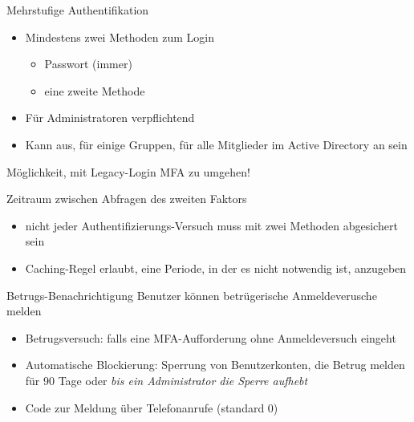 
\begin{flashcard}[Definition]{Mehrstufige Authentifikation}
    \begin{itemize}
        \item Mindestens zwei Methoden zum Login
            \begin{itemize}
                \item Passwort (immer)
                \item eine zweite Methode
            \end{itemize}
        \item Für Administratoren verpflichtend
        \item Kann aus, für einige Gruppen, für alle Mitglieder im Active Directory an sein
    \end{itemize}
    \vspace{1cm}
    Möglichkeit, mit Legacy-Login MFA zu umgehen!
\end{flashcard}


\begin{flashcard}[Definition]{Zeitraum zwischen Abfragen des zweiten Faktors}
    \begin{itemize}
        \item nicht jeder Authentifizierungs-Versuch muss mit zwei Methoden abgesichert sein
        \item Caching-Regel erlaubt, eine Periode, in der es nicht notwendig ist, anzugeben
    \end{itemize}
\end{flashcard}


\begin{flashcard}[Definition]{Betrugs-Benachrichtigung}
    Benutzer können betrügerische Anmeldeverusche melden
    \begin{itemize}
        \item Betrugsversuch:\newline
            falls eine MFA-Aufforderung ohne Anmeldeversuch eingeht
        \item Automatische Blockierung:\newline
            Sperrung von Benutzerkonten, die Betrug melden für 90 Tage oder \emph{bis ein Administrator die Sperre aufhebt}
        \item Code zur Meldung über Telefonanrufe (standard 0)
    \end{itemize}
\end{flashcard}

